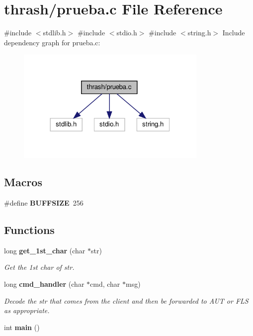 \section{thrash/prueba.c File Reference}
\label{prueba_8c}
{\ttfamily \#include $<$stdlib.\+h$>$}\newline
{\ttfamily \#include $<$stdio.\+h$>$}\newline
{\ttfamily \#include $<$string.\+h$>$}\newline
Include dependency graph for prueba.\+c\+:
\nopagebreak
\begin{figure}[H]
\begin{center}
\leavevmode
\includegraphics[width=260pt]{prueba_8c__incl}
\end{center}
\end{figure}
\subsection*{Macros}
\begin{DoxyCompactItemize}
\item 
\#define \textbf{ B\+U\+F\+F\+S\+I\+ZE}~256
\end{DoxyCompactItemize}
\subsection*{Functions}
\begin{DoxyCompactItemize}
\item 
long \textbf{ get\+\_\+1st\+\_\+char} (char $\ast$str)
\begin{DoxyCompactList}\small\item\em Get the 1st char of str. \end{DoxyCompactList}\item 
long \textbf{ cmd\+\_\+handler} (char $\ast$cmd, char $\ast$msg)
\begin{DoxyCompactList}\small\item\em Decode the str that comes from the client and then be forwarded to A\+UT or F\+LS as appropriate. \end{DoxyCompactList}\item 
int \textbf{ main} ()
\end{DoxyCompactItemize}



